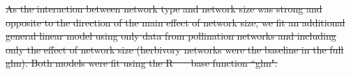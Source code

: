\documentclass[12pt]{article}
\providecommand{\DIFdel}[1]{{\protect\color{red}\sout{#1}}}                      %
\providecommand{\DIFdelend}{} %
\DeclareRobustCommand{\DIFdelend}{\DIFOaddend \let\includegraphics\DIFOincludegraphics} %
\begin{document}
\begin{spacing}{1.5}
\DIFdel{As the interaction between network type and network size was strong and opposite to the direction of the main effect of network size, we fit an additional general linear model using only data from pollination networks and including only the effect of network size (herbivory networks were the baseline in the full glm). Both models were fit using the R~\mbox{%
\citep{R} }\hspace{0pt}%
base function ``glm".
}%

\DIFdelend %




\end{spacing}
\end{document}
